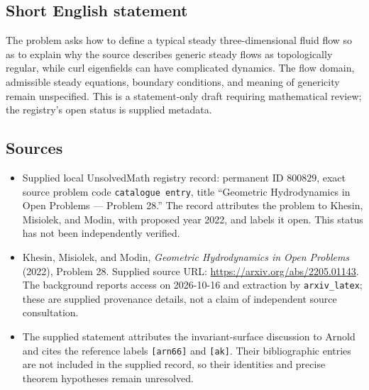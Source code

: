 \documentclass[11pt]{article}
\begin{document}
\subsection{Short English statement}
The problem asks how to define a typical steady three-dimensional fluid flow so as to explain why the source describes generic steady flows as topologically regular, while curl eigenfields can have complicated dynamics. The flow domain, admissible steady equations, boundary conditions, and meaning of genericity remain unspecified. This is a statement-only draft requiring mathematical review; the registry's open status is supplied metadata.
\subsection{Sources}
\begin{itemize}
\item Supplied local UnsolvedMath registry record: permanent ID \(800829\), exact source problem code \texttt{catalogue entry}, title ``Geometric Hydrodynamics in Open Problems --- Problem 28.'' The record attributes the problem to Khesin, Misiolek, and Modin, with proposed year 2022, and labels it open. This status has not been independently verified.
\item Khesin, Misiolek, and Modin, \emph{Geometric Hydrodynamics in Open Problems} (2022), Problem 28. Supplied source URL: \url{https://arxiv.org/abs/2205.01143}. The background reports access on 2026-10-16 and extraction by \texttt{arxiv\_latex}; these are supplied provenance details, not a claim of independent source consultation.
\item The supplied statement attributes the invariant-surface discussion to Arnold and cites the reference labels \texttt{[arn66]} and \texttt{[ak]}. Their bibliographic entries are not included in the supplied record, so their identities and precise theorem hypotheses remain unresolved.
\end{itemize}
\end{document}
